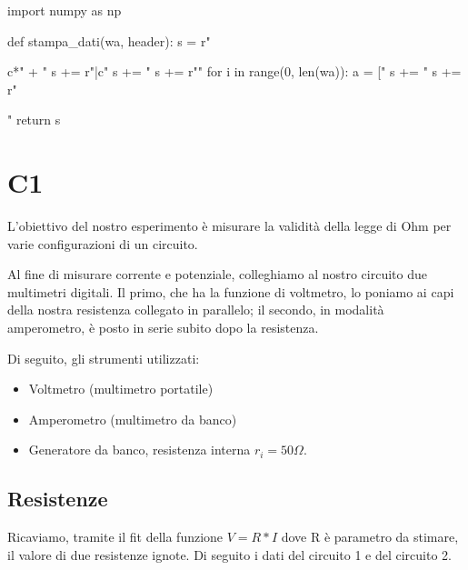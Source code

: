 \begin{sagesilent}
import numpy as np

def stampa_dati(wa, header):
  s = r"\begin{tabular}{c*{" + "%
  s += r"}{|c}}"
  s += "%
  s += r"\midrule"
  for i in range(0, len(wa)):
    a = ["%
    s += "%
  s += r"\end{tabular}"
  return s
\end{sagesilent}



\chapter{C1}

L'obiettivo del nostro esperimento è misurare la validità della legge di Ohm per varie configurazioni di un circuito. 

Al fine di misurare corrente e potenziale, colleghiamo al nostro circuito due multimetri digitali. Il primo, che ha la funzione di voltmetro, lo poniamo ai capi della nostra resistenza collegato in parallelo; il secondo, in modalità amperometro, è posto in serie subito dopo la resistenza. 

Di seguito, gli strumenti utilizzati:
\begin{itemize}
\item Voltmetro (multimetro portatile)
\item Amperometro (multimetro da banco)
\item Generatore da banco, resistenza interna $r_i = 50 \Omega$.
\end{itemize}


\section{Resistenze}

Ricaviamo, tramite  il fit della funzione $V=R*I$ dove R è parametro da stimare, il valore di due resistenze ignote. Di seguito i dati del circuito 1 e del circuito 2. 


